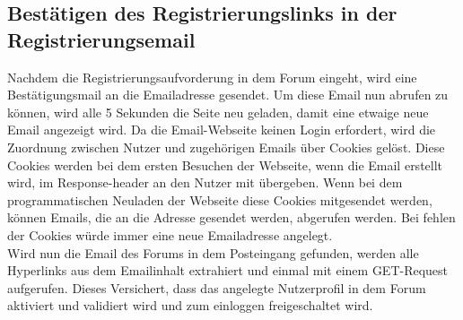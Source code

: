 \subsection{Bestätigen des Registrierungslinks in der Registrierungsemail}
Nachdem die Registrierungsaufvorderung in dem Forum eingeht, wird eine Bestätigungsmail an die Emailadresse gesendet.
Um diese Email nun abrufen zu können, wird alle 5 Sekunden die Seite neu geladen, damit eine etwaige neue Email angezeigt wird. Da die Email-Webseite keinen Login erfordert, wird die Zuordnung zwischen Nutzer und zugehörigen Emails über Cookies gelöst. Diese Cookies werden bei dem ersten Besuchen der Webseite, wenn die Email erstellt wird, im Response-header an den Nutzer mit übergeben. Wenn bei dem programmatischen Neuladen der Webseite diese Cookies mitgesendet werden, können Emails, die an die Adresse gesendet werden, abgerufen werden. Bei fehlen der Cookies würde immer eine neue Emailadresse angelegt.\\
Wird nun die Email des Forums in dem Posteingang gefunden, werden alle Hyperlinks aus dem Emailinhalt extrahiert und einmal mit einem GET-Request aufgerufen. Dieses Versichert, dass das angelegte Nutzerprofil in dem Forum aktiviert und validiert wird und zum einloggen freigeschaltet wird.
\newpage
